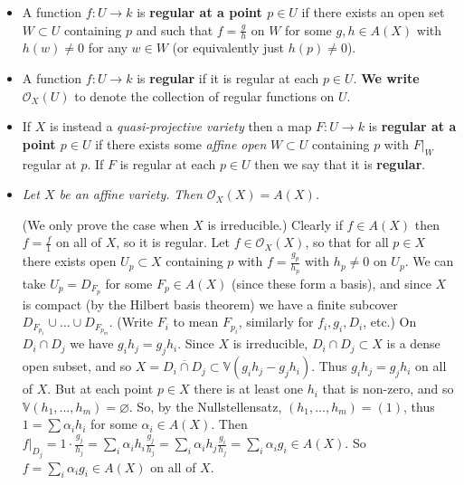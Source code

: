 \documentclass[10pt]{article}
\newcommand{\van}{\mathbb{V}}
\begin{document}
            \begin{itemize}
                \item A function $f\colon U\to k$ is \textbf{regular at a point $p\in U$} if there exists an open set $W\subset U$ containing $p$ and such that $f=\frac{g}{h}$ on $W$ for some $g,h\in A(X)$ with $h(w)\neq0$ for any $w\in W$ (or equivalently just $h(p)\neq0$).
                \item A function $f\colon U\to k$ is \textbf{regular} if it is regular at each $p\in U$.
                    \textbf{We write} $\mathcal{O}_X(U)$ to denote the collection of regular functions on $U$.
                \item If $X$ is instead a \emph{quasi-projective variety} then a map $F\colon U\to k$ is \textbf{regular at a point $p\in U$} if there exists some \emph{affine open} $W\subset U$ containing $p$ with $F|_W$ regular at $p$.
                    If $F$ is regular at each $p\in U$ then we say that it is \textbf{regular}.
                \item \emph{Let $X$ be an affine variety.}
                    \emph{Then $\mathcal{O}_X(X)=A(X)$.}

                    (We only prove the case when $X$ is irreducible.)
                    Clearly if $f\in A(X)$ then $f=\frac{f}{1}$ on all of $X$, so it is regular.
                    Let $f\in\mathcal{O}_X(X)$, so that for all $p\in X$ there exists open $U_p\subset X$ containing $p$ with $f=\frac{g_p}{h_p}$ with $h_p\neq0$ on $U_p$.
                    We can take $U_p=D_{F_p}$ for some $F_p\in A(X)$ (since these form a basis), and since $X$ is compact (by the Hilbert basis theorem) we have a finite subcover $D_{F_{p_1}}\cup\ldots\cup D_{F_{p_m}}$.
                    (Write $F_i$ to mean $F_{p_i}$, similarly for $f_i,g_i,D_i$, etc.)
                    On $D_i\cap D_j$ we have $g_ih_j=g_jh_i$.
                    Since $X$ is irreducible, $D_i\cap D_j\subset X$ is a dense open subset, and so $X=\overline{D_i\cap D_j}\subset\van(g_ih_j-g_jh_i)$.
                    Thus $g_ih_j=g_jh_i$ on all of $X$.
                    But at each point $p\in X$ there is at least one $h_i$ that is non-zero, and so $\van(h_1,\ldots,h_m)=\varnothing$.
                    So, by the Nullstellensatz, $(h_1,\ldots,h_m)=(1)$, thus $1=\sum\alpha_i h_i$ for some $\alpha_i\in A(X)$.
                    Then $f|_{D_j}=1\cdot\frac{g_j}{h_j}=\sum_i\alpha_i h_i\frac{g_j}{h_j}=\sum_i\alpha_i h_j\frac{g_i}{h_j}=\sum_i\alpha_i g_i\in A(X)$.
                    So $f=\sum_i\alpha_i g_i\in A(X)$ on all of $X$.


\end{itemize}
\end{document}
